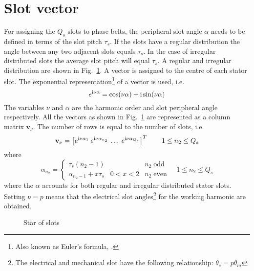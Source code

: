 \section{Slot vector}
For assigning the $Q_s$ slots to phase belts, the peripheral slot angle $\alpha$ needs to be defined in terms of the slot pitch $\tau_s$. If the slots have a regular distribution the angle between any two adjacent slots equals $\tau_s$. In the case of irregular distributed slots the average slot pitch will equal $\tau_s$. A regular and irregular distribution are shown in Fig.~\ref{fig:f_slotstar}. A vector is assigned to the centre of each stator slot. The exponential representation\footnote{Also known as Euler's formula, \cite{REF-01047}.} of a vector is used, i.e.
\begin{equation} 
  e^{{\mathrm{i}}\nu \alpha}=\cos(\nu \alpha)+{\mathrm{i}}\sin(\nu \alpha)
\end{equation}
The variables $\nu$ and $\alpha$ are the harmonic order and slot peripheral angle respectively. All the vectors as shown in Fig.~\ref{fig:f_slotstar} are represented as a column matrix $\mathbf{v}_{\nu}$. The number of rows is equal to the number of slots, i.e.
\begin{equation}
  \label{eqn:slot_vector}
  \mathbf{v}_{\nu}=\left[
                         e^{{\mathrm{i}}\nu\alpha_1} 
                         \: 
                         e^{{\mathrm{i}}\nu\alpha_{n_2}} 
                         \:
                         \ldots 
                         \: e^{{\mathrm{i}}\nu\alpha_{Q_s}}
                    \right]^{T}
   \qquad 1 \leq n_2 \leq Q_s                 
\end{equation}
where
\begin{equation}
  \label{eqn:slot_alpha}
  \alpha_{n_2} = \left\{ \begin{array}{lll}
    \tau_s\left(n_2-1\right) && n_2 \;\text{odd}\\
    \alpha_{n_2-1}+x\tau_s & 0<x<2 & n_2\;\text{even}
  \end{array} \right.
  \quad
  1 \leq n_2 \leq Q_s
\end{equation}
where the $\alpha$ accounts for both regular and irregular distributed stator slots. Setting $\nu=p$ means that the electrical slot angles\footnote{The electrical and mechanical slot have the following relationship: $\theta_e=p \theta_m$} for the working harmonic are obtained. 
\begin{figure}
\fontsize{8}{0}\selectfont
  \centering
  	
  \caption{Star of slots}
  \label{fig:f_slotstar}
\end{figure}

